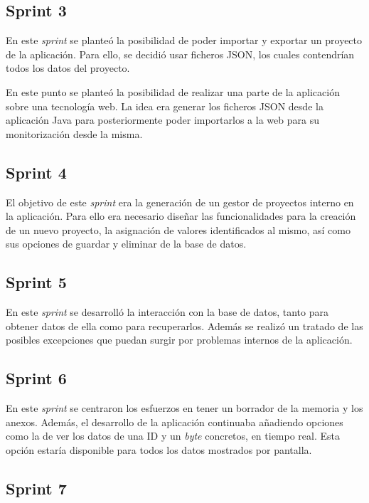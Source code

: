 \subsection{Sprint 3}

En este \emph{sprint} se planteó la posibilidad de poder importar y exportar un proyecto de la aplicación. Para ello, se decidió usar ficheros JSON, los cuales contendrían todos los datos del proyecto.

En este punto se planteó la posibilidad de realizar una parte de la aplicación sobre una tecnología web. La idea era generar los ficheros JSON desde la aplicación Java para posteriormente poder importarlos a la web para su monitorización desde la misma.


\subsection{Sprint 4}

El objetivo de este \emph{sprint} era la generación de un gestor de proyectos interno en la aplicación. Para ello era necesario diseñar las funcionalidades para la creación de un nuevo proyecto, la asignación de valores identificados al mismo, así como sus opciones de guardar y eliminar de la base de datos.


\subsection{Sprint 5}

En este \emph{sprint} se desarrolló la interacción con la base de datos, tanto para obtener datos de ella como para recuperarlos. Además se realizó un tratado de las posibles excepciones que puedan surgir por problemas internos de la aplicación.


\subsection{Sprint 6}

En este \emph{sprint} se centraron los esfuerzos en tener un borrador de la memoria y los anexos. Además, el desarrollo de la aplicación continuaba añadiendo opciones como la de ver los datos de una ID y un \emph{byte} concretos, en tiempo real. Esta opción estaría disponible para todos los datos mostrados por pantalla.


\subsection{Sprint 7}

